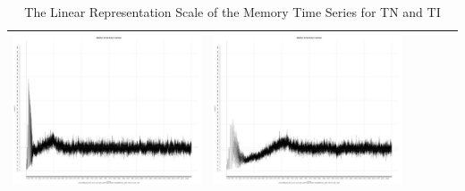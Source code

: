 \begin{table}[htbp]
{\begin{tabular}{l | ccccc}
\begin{minipage}{.15\textwidth}
     			 	\includegraphics[width=\linewidth]{images/mema-triple/I14}
    				 \end{minipage}
    			   &	 \begin{minipage}{.15\textwidth}
     			 	\includegraphics[width=\linewidth]{images/mema-triple/I15}
    				 \end{minipage}\\
		\hline %
	 \end{tabular}
	}
	\caption[\textsc{Analyser} Investigation Stack - Level 2 - Pattern Identification - Memory - Baselines TN and NI]{The Linear Representation Scale of the Memory Time Series for TN and TI} 
 	\label{tab:level2-memory-triple}
\end{table}